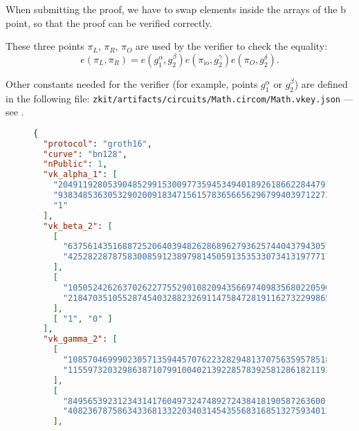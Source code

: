 \documentclass[../lecture-notes.tex]{subfiles}
\begin{document}
    \begin{remark}
        When submitting the proof, we have to swap elements inside the arrays of the b point, so that the proof can be verified correctly.
    \end{remark}

    These three points $\pi_L$, $\pi_R$, $\pi_O$ are used by the verifier to check the equality:
    \[
        e(\pi_L, \pi_R) = e(g_1^\alpha, g_2^\beta)e(\pi_{\text{io}},g_2^\gamma)e(\pi_O,g_2^\delta).
    \]

    Other constants needed for the verifier (for example, points $g_1^{\alpha}$ or $g_2^{\beta}$) are defined in the following file: \texttt{zkit/artifacts/circuits/Math.circom/Math.vkey.json} --- see .

    \begin{figure}
        \begin{center}
            \begin{tcolorbox}[enhanced,
                width=0.75\textwidth,
                title=\textbf{vkey.json},
                coltitle=gray!25!black,
                attach boxed title to top center={yshift=-2mm,yshifttext=-1mm},
                boxed title style={size=small,colframe=gray!75!black,
                colback=purple!30!white,boxrule=1pt},
                top=-0.35cm,
                bottom=-0.35cm]
                \begin{lstlisting}[language=JSON,numbers=none,basicstyle=\footnotesize\ttfamily\tiny]
{
  "protocol": "groth16",
  "curve": "bn128",
  "nPublic": 1,
  "vk_alpha_1": [
    "20491192805390485299153009773594534940189261866228447918068658471970481763042",
    "9383485363053290200918347156157836566562967994039712273449902621266178545958",
    "1"
  ],
  "vk_beta_2": [
    [
      "6375614351688725206403948262868962793625744043794305715222011528459656738731",
      "4252822878758300859123897981450591353533073413197771768651442665752259397132"
    ],
    [
      "10505242626370262277552901082094356697409835680220590971873171140371331206856",
      "21847035105528745403288232691147584728191162732299865338377159692350059136679"
    ],
    [ "1", "0" ]
  ],
  "vk_gamma_2": [
    [
      "10857046999023057135944570762232829481370756359578518086990519993285655852781",
      "11559732032986387107991004021392285783925812861821192530917403151452391805634"
    ],
    [
      "8495653923123431417604973247489272438418190587263600148770280649306958101930",
      "4082367875863433681332203403145435568316851327593401208105741076214120093531"
    ],

\end{lstlisting}
\end{tcolorbox}
\end{center}
\end{figure}
\end{document}
